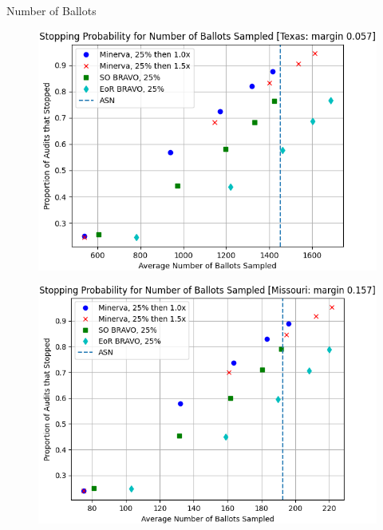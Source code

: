 \documentclass[final]{beamer}
\newlength{\colwidth}
\begin{document}
\begin{frame}[t]
\begin{columns}[t]
\begin{column}{\colwidth}
\begin{block}{Number of Ballots}
\begin{figure}[h]
\centering
\begin{minipage}{.49\textwidth}
\begin{centering}
\includegraphics[width=1\textwidth]{texas25.png}
\label{fig:texas_25}
\end{centering}
\end{minipage}
\begin{minipage}{.49\textwidth}
\begin{centering}
\includegraphics[width=1\textwidth]{missouri25.png}

\end{centering}
\end{minipage}
\end{figure}
\end{block}
\end{column}
\end{columns}
\end{frame}
\end{document}
